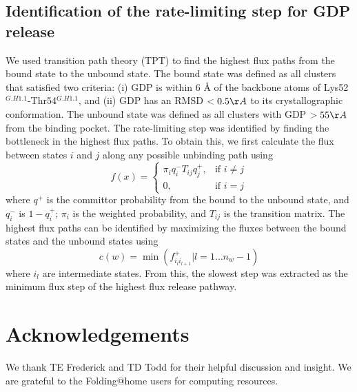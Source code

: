 \documentclass[../main.tex]{subfiles}
\begin{document}
    \subsection{Identification of the rate-limiting step for GDP release}
        We used transition path theory (TPT) \cite{Noe:2009en,Weinan:2006vr} to find the highest flux paths from the bound state to the unbound state\cite{Metzner:2009jl}. The bound state was defined as all clusters that satisfied two criteria: (i) GDP is within 6 \AA{} of the backbone atoms of Lys52$^{G.H1.1}$-Thr54$^{G.H1.1}$, and (ii) GDP has an RMSD $<0.5 \AA$ to its crystallographic conformation. The unbound state was defined as all clusters with GDP $> 55 \AA$ from the binding pocket. The rate-limiting step was identified by finding the bottleneck in the highest flux paths. To obtain this, we first calculate the flux between states $i$ and $j$ along any possible unbinding path using
        \[
            f(x)= 
        \begin{cases}
            \pi_{i}q_{i}^{-}T_{ij}q^{+}_{j},& \text{if } i\neq j\\
            0,              & \text{if } {i = j}
        \end{cases}
        \]
        where $q^{+}$ is the committor probability from the bound to the unbound state, and $q_{i}^{-}$ is $1-q^{+}_{i}$; $\pi_{i}$ is the weighted probability, and $T_{ij}$ is the transition matrix. The highest flux paths can be identified by maximizing the fluxes between the bound states and the unbound states using
        \begin{equation}\label{highest-flux-path-eq}
            c(w)=\min{(f^{+}_{i_{l}i_{l+1}}|l=1\ldots n_{w}-1)}
        \end{equation}
        where $i_{l}$ are intermediate states. From this, the slowest step was extracted as the minimum flux step of the highest flux release pathway.
  
	\section{Acknowledgements}
        We thank TE Frederick and TD Todd for their helpful discussion and insight. We are grateful to the Folding@home users for computing resources. 
		
    	
\end{document}
